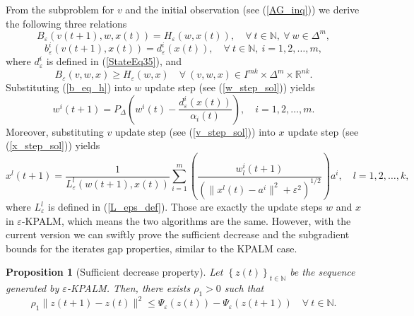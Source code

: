 \documentclass[11pt]{article}
\numberwithin{equation}{section}
\newtheorem{proposition}{Proposition}[section]
\newcommand{\nn}{\mathbb{N}} %
\newcommand{\rr}{\mathbb{R}} %
\begin{document}
From the subproblem for $v$ and the initial observation (see (\ref{AG_inq})) we derive the following three relations
\begin{equation}
	B_{\varepsilon}(v(t+1),w,x(t)) = H_{\varepsilon}(w,x(t)), \quad \forall \: t \in \nn, \: \forall \: w \in \Delta^{m} , \label{B_eq_H}
\end{equation}
\begin{equation}
	b^i_{\varepsilon}(v(t+1),x(t)) = d^i_{\varepsilon}(x(t)), \quad \forall \: t \in \nn, \: i=1,2,\ldots,m , \label{b_eq_h}
\end{equation}
where $d^i_{\varepsilon}$ is defined in (\ref{StateEq35}), and
\begin{equation}
	B_{\varepsilon}(v,w,x) \geq H_{\varepsilon}(w,x) \quad \forall \: (v,w,x) \in I^{mk} \times \Delta^{m} \times \rr^{nk} . \label{B_geq_H}
\end{equation}
Substituting (\ref{b_eq_h}) into $w$ update step (see (\ref{w_step_sol})) yields
\begin{equation*}
	w^i(t+1) = P_{\Delta}\left( w^i(t) - \frac{d^i_{\varepsilon}(x(t))}{\alpha_i(t)} \right), \quad i=1,2,\ldots,m . 
\end{equation*}
Moreover, substituting $v$ update step (see (\ref{v_step_sol})) into $x$ update step (see (\ref{x_step_sol})) yields
\begin{equation*}
	x^l(t+1) = \frac{1}{L^l_{\varepsilon}(w(t+1),x(t))} \sum\limits_{i=1}^{m} \left( \frac{w^i_l(t+1)}{\left( \|x^l(t) - a^i\|^2 + {\varepsilon}^2 \right)^{1/2}} \right) a^i, \quad l=1,2,\ldots,k ,
\end{equation*}
where $L^l_{\varepsilon}$ is defined in (\ref{L_eps_def}). Those are exactly the update steps $w$ and $x$ in $\varepsilon$-KPALM, which means the two algorithms are the same. However, with the current version we can swiftly prove the sufficient decrease and the subgradient bounds for the iterates gap properties, similar to the KPALM case.

\begin{proposition}[Sufficient decrease property]
Let $\left\lbrace z(t) \right\rbrace_{t \in \mathbb{N}}$ be the sequence generated by $\varepsilon$-KPALM. Then, there exists $\rho_1 > 0$ such that 
\begin{equation*}
	\rho_1 \|z(t+1) - z(t)\|^2 \leq \Psi_{\varepsilon}(z(t)) - \Psi_{\varepsilon}(z(t+1)) \quad \forall \: t \in \mathbb{N} .
\end{equation*}
\end{proposition}
\end{document}
